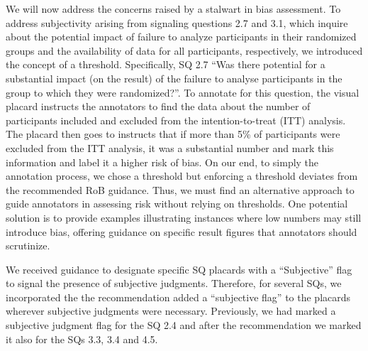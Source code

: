 \documentclass[sn-mathphys,Numbered]{sn-jnl}%
\theoremstyle{thmstyleone}%
\theoremstyle{thmstyletwo}%
\theoremstyle{thmstylethree}%
\begin{document}
We will now address the concerns raised by a stalwart in bias assessment.
To address subjectivity arising from signaling questions 2.7 and 3.1, which inquire about the potential impact of failure to analyze participants in their randomized groups and the availability of data for all participants, respectively, we introduced the concept of a threshold.
Specifically, SQ 2.7 ``Was there potential for a substantial impact (on the result) of the failure to analyse participants in the group to which they were randomized?''.
To annotate for this question, the visual placard instructs the annotators to find the data about the number of participants included and excluded from the intention-to-treat (ITT) analysis.
The placard then goes to instructs that if more than 5\% of participants were excluded from the ITT analysis, it was a substantial number and mark this information and label it a higher risk of bias.
On our end, to simply the annotation process, we chose a threshold but enforcing a threshold deviates from the recommended RoB guidance.
Thus, we must find an alternative approach to guide annotators in assessing risk without relying on thresholds.
One potential solution is to provide examples illustrating instances where low numbers may still introduce bias, offering guidance on specific result figures that annotators should scrutinize.



We received guidance to designate specific SQ placards with a ``Subjective'' flag to signal the presence of subjective judgments.
Therefore, for several SQs, we incorporated the the recommendation added a ``subjective flag'' to the placards wherever subjective judgments were necessary.
Previously, we had marked a subjective judgment flag for the SQ 2.4 and after the recommendation we marked it also for the SQs 3.3, 3.4 and 4.5.
\end{document}
